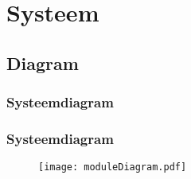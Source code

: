 \section{Systeem}

\subsection*{Diagram}


\begin{frame}
    \frametitle{Systeemdiagram}
    
\end{frame}

\transboxin


\begin{frame}
    \frametitle{Systeemdiagram}
    
    \begin{figure}
        \centering
        \texttt{[image: moduleDiagram.pdf]}
    \end{figure}
    
\end{frame}



